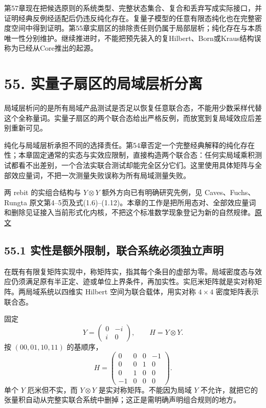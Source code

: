 \documentclass[
  11pt,
  oneside]{book}
\begin{document}
第57章现在把候选原则的系统类型、完整状态集合、复合和丢弃写成实际接口，并证明经典反例经适配后仍违反纯化存在。复量子模型的任意有限态纯化也在完整密度空间中得到证明。第55章实扇区的排除责任则仍属于局部层析；纯化存在与本质唯一性分别维护。继续推进时，不能把预先装入的复Hilbert、Born或Kraus结构误称为已经从Core推出的起源。

\chapter{55. 实量子扇区的局域层析分离}\label{ch-55}\hypertarget{ch-55}{}

局域层析问的是所有局域产品测试是否足以恢复任意联合态，不能用少数采样代替这个全称量词。实量子扇区的两个联合态给出严格反例，而放宽到复局域效应后差别重新可见。

纯化与局域层析承担不同的选择责任。第54章否定一个完整经典解释的纯化存在性；本章固定通常的实态与实效应限制，直接构造两个联合态：任何实局域乘积测试都看不出差别，一个合法实联合测试却能完全区分它们。这里使用具体矩阵与全部效应量词，不把一次测量失败误称为所有局域测量失败。

两 rebit 的实组合结构与 \(Y\otimes Y\) 额外方向已有明确研究先例，见
Caves、Fuchs、Rungta
原文第4--5页及式(1.6)--(1.12)。本章的工作是把所用态对、全部效应量词和删除见证接入当前形式化内核，不把这个标准数学现象登记为新的自然规律。\href{https://arxiv.org/abs/quant-ph/0009063}{原文}

\section{55.1 实性是额外限制，联合系统必须独立声明}

在既有有限复矩阵实现中，称矩阵实，指其每个条目的虚部为零。局域密度态与效应仍须满足原有半正定、迹或单位上界条件，再加实性。实厄米矩阵就是实对称矩阵。两局域系统以四维实
Hilbert 空间为联合载体，用实对称 \(4\times4\) 密度矩阵表示联合态。

固定 \[
Y=\begin{pmatrix}0&-i\\i&0\end{pmatrix},\qquad H=Y\otimes Y.
\] 按 \((00,01,10,11)\) 的基顺序， \[
H=\begin{pmatrix}
0&0&0&-1\\
0&0&1&0\\
0&1&0&0\\
-1&0&0&0
\end{pmatrix}.
\] 单个 \(Y\) 厄米但不实，而 \(Y\otimes Y\) 是实对称矩阵。不能因为局域
\(Y\)
不允许，就把它的张量积自动从完整实联合系统中删掉；这正是需明确声明组合规则的地方。
\end{document}
